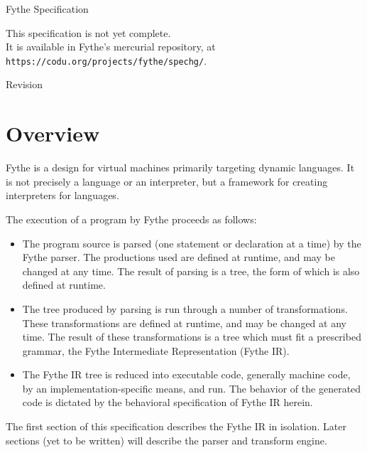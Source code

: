 \usepackage{multicol}

\setlength{\pdfpageheight}{\paperheight}
\setlength{\pdfpagewidth}{\paperwidth}



\ifdefined\specdocheader
    \specdocheader
\else\fi

\begin{titlepage}
\begin{center}

\Huge{\textsf{Fythe Specification}}

\small{This specification is not yet complete.\\It is available in Fythe's mercurial repository, at \texttt{https://codu.org/projects/fythe/spechg/}.}

\Large{\textsf{Revision }}

\large{}

\end{center}
\end{titlepage}

\tableofcontents

\chapter{Overview}

Fythe is a design for virtual machines primarily targeting dynamic languages.
It is not precisely a language or an interpreter, but a framework for creating
interpreters for languages.

The execution of a program by Fythe proceeds as follows:

\begin{itemize}
\item
The program source is parsed (one statement or declaration at a time) by the
Fythe parser. The productions used are defined at runtime, and may be changed
at any time. The result of parsing is a tree, the form of which is also defined
at runtime.

\item
The tree produced by parsing is run through a number of transformations.  These
transformations are defined at runtime, and may be changed at any time. The
result of these transformations is a tree which must fit a prescribed grammar,
the Fythe Intermediate Representation (Fythe IR).

\item
The Fythe IR tree is reduced into executable code, generally machine code, by
an implementation-specific means, and run. The behavior of the generated code
is dictated by the behavioral specification of Fythe IR herein.
\end{itemize}

The first section of this specification describes the Fythe IR in isolation.
Later sections (yet to be written) will describe the parser and transform
engine.




